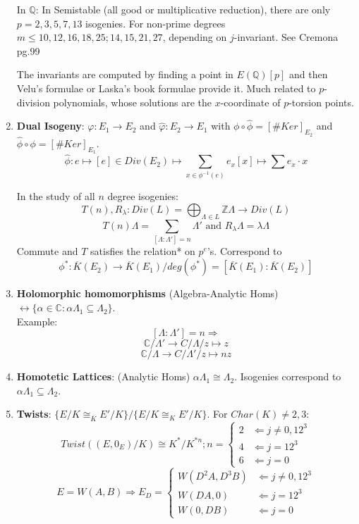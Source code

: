 \documentclass{article}
\newcommand{\Q}{\mathbb{Q}}
\newcommand{\C}{\mathbb{C}}
\newcommand{\Z}{\mathbb{Z}}
\newcommand{\ra}{\rightarrow}
\newcommand{\Ra}{\Rightarrow}
\newcommand{\La}{\Leftarrow}
\newcommand{\lra}{\leftrightarrow}
\newcommand{\ACK}{\overline{K}}
\begin{document}
\begin{multicols}{2}
\begin{enumerate}
In $\Q$: In Semistable (all good or multiplicative reduction), there are only $p = 2,3,5,7,13$ isogenies. For non-prime degrees $m \leq 10, 12,16,18,25; 14,15,21,27$, depending on $j$-invariant. See Cremona pg.99

The invariants are computed by finding a point in $E(\Q)[p]$ and then Velu's formulae or Laska's book formulae provide it. Much related to $p$-division polynomials, whose solutions are the $x$-coordinate of $p$-torsion points.

\item \textbf{Dual Isogeny}: $\varphi: E_1 \ra E_2$ and $\hat{\varphi}: E_2 \ra E_1$ with $\phi \circ \hat{\phi} = [\# Ker]_{E_2}$ and $\hat{\phi} \circ \phi = [\#Ker]_{E_1}$. 
\[\hat{\phi}: e \mapsto [e] \in Div(E_2) \mapsto \sum_{x \in \phi^{-1}(e)} e_x [x] \mapsto \sum e_x\cdot x\]

In the study of all $n$ degree isogenies: 
\[T(n),R_\lambda: Div(L) = \bigoplus_{\Lambda \in L}\Z \Lambda \ra Div(L)\]
\[T(n)\Lambda = \sum_{[\Lambda:\Lambda'] = n} \Lambda' \textrm{ and } R_\lambda \Lambda = \lambda \Lambda\]
Commute and $T$ satisfies the relation* on $p^e$'s. Correspond to 
\[\phi^*: \ACK(E_2) \ra \ACK(E_1)/ deg(\phi^*) = [\ACK(E_1):\ACK(E_2)]\]

\item \textbf{Holomorphic homomorphisms} (Algebra-Analytic Homs) $\lra \{\alpha \in \C: \alpha \Lambda_1 \subseteq \Lambda_2\}$.\\
Example: 
\[[\Lambda:\Lambda'] = n \Ra \]
\[\C/\Lambda' \ra C/\Lambda/ z \mapsto z\] 
\[\C/\Lambda \ra C/\Lambda'/ z \mapsto nz\] 

\item \textbf{Homotetic Lattices}: (Analytic Homs) $\alpha \Lambda_1 \cong \Lambda_2$. Isogenies correspond to $\alpha \Lambda_1 \subseteq \Lambda_2$. 

\item \textbf{Twists}: $\{E/K \cong_{\ACK} E'/K\}/\{E/K \cong_K E'/K\}$. For $Char(K) \neq 2,3$: 
\[Twist((E,0_E)/K) \cong K^*/K^{*n}; n = \left\{\begin{array}{cc} 2 & \La j \neq 0, 12^3 \\  4 & \La j = 12^3 \\ 6 & \La j = 0 \end{array}\right.\]
\[E = W(A,B) \Ra E_D = \left\{\begin{array}{cc} W(D^2A,D^3B) & \La j \neq 0, 12^3 \\  W(DA,0) & \La j = 12^3 \\ W(0,DB) & \La j = 0 \end{array}\right.\]




\end{enumerate}
\end{multicols}
\end{document}
